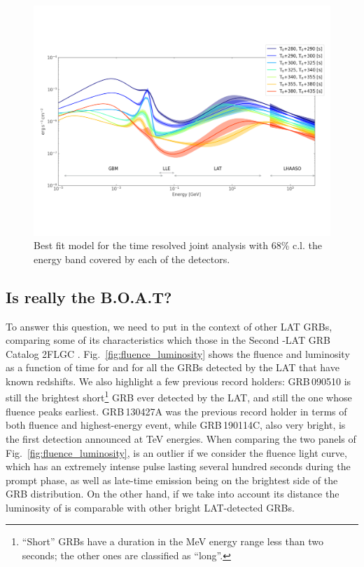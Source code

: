 \documentclass[preprint]{aastex631}
\begin{document}
\begin{figure}[t]
     \centering    
     \includegraphics[width=1\linewidth]{best_models_time_resolved_new.pdf}    
     \caption{Best fit model  for the time resolved joint analysis with 68\% c.l.  the energy band covered by each of the detectors. 
     }
     \label{fig:joint_fit}
 \end{figure}

\subsection{Is \grb really the B.O.A.T?}
\label{catalog}
To answer this question, we need to put \grb in the context of other LAT GRBs, comparing some of its characteristics which those in the Second \Fermi-LAT GRB Catalog 2FLGC \citep{2FLGC}. Fig.~\ref{fig:fluence_luminosity} shows the fluence and luminosity as a function of time for \grb and for all the GRBs detected by the LAT that have known redshifts. 
We also highlight a few previous record holders: GRB\,090510 is still the brightest short\footnote{``Short'' GRBs have a duration in the MeV energy range less than two seconds; the other ones are classified as ``long''.} GRB ever detected by the LAT, and still the one whose fluence peaks earliest. GRB\,130427A was the previous record holder in terms of both fluence and highest-energy event, while GRB\,190114C, also very bright, is the first detection announced at TeV energies.
When comparing the two panels of Fig.~\ref{fig:fluence_luminosity}, \grb is an outlier if we consider the fluence light curve, which has an extremely intense pulse lasting several hundred seconds during the prompt phase, as well as late-time emission being on the brightest side of the GRB distribution. On the other hand, if we take into account its distance the luminosity of \grb is comparable with other bright LAT-detected GRBs. 
\end{document}
